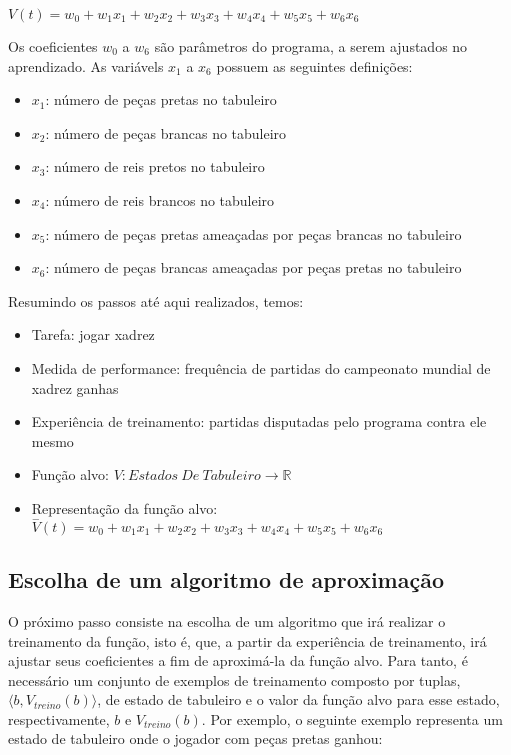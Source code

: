 $V(t) = w_0 + w_1 x_1 + w_2 x_2 + w_3 x_3 + w_4 x_4 + w_5 x_5 + w_6 x_6$

Os coeficientes $w_0$ a $w_6$ são parâmetros do programa, a serem ajustados no aprendizado. As variávels $x_1$ a $x_6$ possuem as seguintes definições:

\begin{itemize}
\item $x_1$: número de peças pretas no tabuleiro
\item $x_2$: número de peças brancas no tabuleiro
\item $x_3$: número de reis pretos no tabuleiro
\item $x_4$: número de reis brancos no tabuleiro
\item $x_5$: número de peças pretas ameaçadas por peças brancas no tabuleiro
\item $x_6$: número de peças brancas ameaçadas por peças pretas no tabuleiro
\end{itemize}

Resumindo os passos até aqui realizados, temos:

\begin{itemize}

\item Tarefa: jogar xadrez
\item Medida de performance: frequência de partidas do campeonato mundial de xadrez ganhas
\item Experiência de treinamento: partidas disputadas pelo programa contra ele mesmo
\item Função alvo: $V:Estados\ De\ Tabuleiro \rightarrow \mathbb{R}$
\item Representação da função alvo: $\overset{-}{V}(t) = w_0 + w_1 x_1 + w_2 x_2 + w_3 x_3 + w_4 x_4 + w_5 x_5 + w_6 x_6$

\end{itemize}

\subsection*{Escolha de um algoritmo de aproximação}

O próximo passo consiste na escolha de um algoritmo que irá realizar o treinamento da função, isto é, que, a partir da experiência de treinamento, irá ajustar seus coeficientes a fim de aproximá-la da função alvo. Para tanto, é necessário um conjunto de exemplos de treinamento composto por tuplas, $\langle b, V_{treino}(b) \rangle $, de estado de tabuleiro e o valor da função alvo para esse estado, respectivamente, $b$ e $V_{treino}(b)$. Por exemplo, o seguinte exemplo representa um estado de tabuleiro onde o jogador com peças pretas ganhou:

